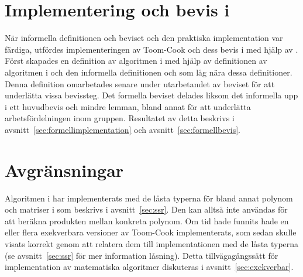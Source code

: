 \section{Implementering och bevis i \coq{}}
När informella definitionen och beviset och den praktiska implementation var
färdiga, utfördes implementeringen av Toom-Cook och dess bevis i \coq{} med
hjälp av \ssr{}. Först skapades en definition av algoritmen i \coq{} med hjälp
av definitionen av algoritmen i \haskell{} och den informella definitionen och
som låg nära dessa definitioner. Denna definition omarbetades senare under
utarbetandet av beviset för att underlätta vissa bevissteg. Det formella
beviset delades liksom det informella upp i ett huvudbevis och mindre lemman,
bland annat för att underlätta arbetsfördelningen inom gruppen. Resultatet av
detta beskrivs i avsnitt~\ref{sec:formellimplementation} och
avsnitt~\ref{sec:formellbevis}.

\section{Avgränsningar}
Algoritmen i \coq{} har implementerats med de låsta typerna för bland annat
polynom och matriser i \ssr{} som beskrivs i avsnitt~\ref{sec:ssr}. Den kan
alltså inte användas för att beräkna produkten mellan konkreta polynom. Om tid
hade funnits hade en eller flera exekverbara versioner av Toom-Cook
implementerats, som sedan skulle visats korrekt genom att relatera dem till
implementationen med de låsta typerna (se avsnitt~\ref{sec:ssr} för mer
information låsning). Detta tillvägagångssätt för implementation av matematiska
algoritmer diskuteras i avsnitt~\ref{sec:exekverbar}.
